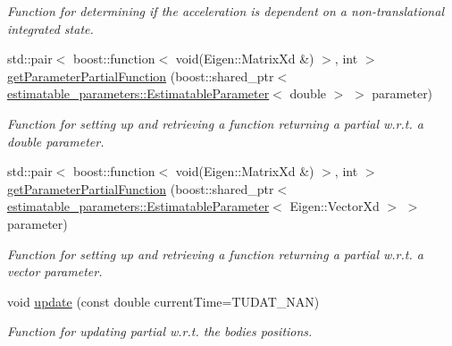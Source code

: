 \begin{DoxyCompactItemize}
\begin{DoxyCompactList}\small\item\em Function for determining if the acceleration is dependent on a non-\/translational integrated state. \end{DoxyCompactList}\item 
std\+::pair$<$ boost\+::function$<$ void(Eigen\+::\+Matrix\+Xd \&) $>$, int $>$ \hyperlink{classtudat_1_1acceleration__partials_1_1CentralGravitationPartial_a37e8ef888f9cdc9cb946d5a7ae3fcb00}{get\+Parameter\+Partial\+Function} (boost\+::shared\+\_\+ptr$<$ \hyperlink{classtudat_1_1estimatable__parameters_1_1EstimatableParameter}{estimatable\+\_\+parameters\+::\+Estimatable\+Parameter}$<$ double $>$ $>$ parameter)
\begin{DoxyCompactList}\small\item\em Function for setting up and retrieving a function returning a partial w.\+r.\+t. a double parameter. \end{DoxyCompactList}\item 
std\+::pair$<$ boost\+::function$<$ void(Eigen\+::\+Matrix\+Xd \&) $>$, int $>$ \hyperlink{classtudat_1_1acceleration__partials_1_1CentralGravitationPartial_ae21256b30f9648d48dc6c53805127d22}{get\+Parameter\+Partial\+Function} (boost\+::shared\+\_\+ptr$<$ \hyperlink{classtudat_1_1estimatable__parameters_1_1EstimatableParameter}{estimatable\+\_\+parameters\+::\+Estimatable\+Parameter}$<$ Eigen\+::\+Vector\+Xd $>$ $>$ parameter)
\begin{DoxyCompactList}\small\item\em Function for setting up and retrieving a function returning a partial w.\+r.\+t. a vector parameter. \end{DoxyCompactList}\item 
void \hyperlink{classtudat_1_1acceleration__partials_1_1CentralGravitationPartial_a340849314fd38579fdbf17d58b197be8}{update} (const double current\+Time=T\+U\+D\+A\+T\+\_\+\+N\+AN)
\begin{DoxyCompactList}\small\item\em Function for updating partial w.\+r.\+t. the bodies\textquotesingle{} positions. \end{DoxyCompactList}\end{DoxyCompactItemize}
